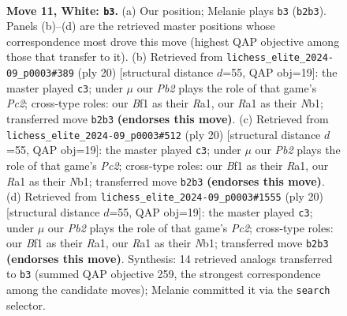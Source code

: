 \documentclass[11pt]{article}
\begin{document}
\begin{figure}[p]\centering
\begin{subfigure}{0.46\textwidth}\centering
\resizebox{\linewidth}{!}{%
\newchessgame
\chessboard[
  setfen={r1bq1rk1/pppp1p1p/3n1bp1/8/8/2N5/PPPP1PPP/R1BQRBK1 w - - 0 11},
  showmover=false,
  pgfstyle=straightmove, color=movearrow, markmove={b2-b3}
]}
\caption{}
\end{subfigure}\hfill
\begin{subfigure}{0.46\textwidth}\centering
\resizebox{\linewidth}{!}{%
\newchessgame
\chessboard[
  setfen={r1bqr1k1/pppp1ppp/3n1b2/8/3P4/8/PPP2PPP/RNBQRBK1 w - - 3 11},
  showmover=false,
  pgfstyle=straightmove, color=movearrow, markmove={c2-c3}
]}
\caption{}
\end{subfigure}
\\[4pt]
\begin{subfigure}{0.46\textwidth}\centering
\resizebox{\linewidth}{!}{%
\newchessgame
\chessboard[
  setfen={r1bqr1k1/pppp1ppp/3n1b2/8/3P4/8/PPP2PPP/RNBQRBK1 w - - 3 11},
  showmover=false,
  pgfstyle=straightmove, color=movearrow, markmove={c2-c3}
]}
\caption{}
\end{subfigure}\hfill
\begin{subfigure}{0.46\textwidth}\centering
\resizebox{\linewidth}{!}{%
\newchessgame
\chessboard[
  setfen={r1bqr1k1/pppp1ppp/3n1b2/8/3P4/8/PPP2PPP/RNBQRBK1 w - - 3 11},
  showmover=false,
  pgfstyle=straightmove, color=movearrow, markmove={c2-c3}
]}
\caption{}
\end{subfigure}
\caption{\textbf{Move 11, White: \texttt{b3}.} (a) Our position; Melanie plays \texttt{b3} (\texttt{b2b3}). Panels (b)--(d) are the retrieved master positions whose correspondence most drove this move (highest QAP objective among those that transfer to it). (b) Retrieved from \texttt{lichess\_elite\_2024-09\_p0003\#389} (ply 20) [structural distance $d$=55, QAP obj=19]: the master played \texttt{c3}; under $\mu$ our \emph{Pb2} plays the role of that game's \emph{Pc2}; cross-type roles: our \emph{B}f1 as their \emph{R}a1, our \emph{R}a1 as their \emph{N}b1; transferred move \texttt{b2b3} \textbf{(endorses this move)}. (c) Retrieved from \texttt{lichess\_elite\_2024-09\_p0003\#512} (ply 20) [structural distance $d$=55, QAP obj=19]: the master played \texttt{c3}; under $\mu$ our \emph{Pb2} plays the role of that game's \emph{Pc2}; cross-type roles: our \emph{B}f1 as their \emph{R}a1, our \emph{R}a1 as their \emph{N}b1; transferred move \texttt{b2b3} \textbf{(endorses this move)}. (d) Retrieved from \texttt{lichess\_elite\_2024-09\_p0003\#1555} (ply 20) [structural distance $d$=55, QAP obj=19]: the master played \texttt{c3}; under $\mu$ our \emph{Pb2} plays the role of that game's \emph{Pc2}; cross-type roles: our \emph{B}f1 as their \emph{R}a1, our \emph{R}a1 as their \emph{N}b1; transferred move \texttt{b2b3} \textbf{(endorses this move)}. Synthesis: 14 retrieved analogs transferred to \texttt{b3} (summed QAP objective 259, the strongest correspondence among the candidate moves); Melanie committed it via the \texttt{search} selector.}
\label{fig:thought-m20}
\end{figure}
\end{document}

